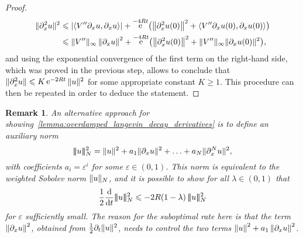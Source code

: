 \documentclass[11pt,a4paper]{article}
\DeclareMathOperator{\e}{e}
\theoremstyle{plain}
\newtheorem{remark}{Remark}[section]
\numberwithin{equation}{section}
\renewcommand{\leq}{\leqslant}
\renewcommand{\geq}{\geqslant}
\begin{document}
\begin{proof}
    \begin{align*}
        \norm*{\partial_x^2 u}^2
        &\leq \abs{\ip{V'' \partial_x u}{\partial_x u}} + \e^{-4Rt} \bigl( \norm{\partial_x^2 u(0)}^2 + \ip{V'' \partial_x u(0)}{\partial_x u(0)} \bigr) \\
        &\leq \norm*{V''}_{\infty} \norm{\partial_x u}^2 + \e^{-4Rt} \bigl( \norm{\partial_x^2 u(0)}^2 + \norm*{V''}_{\infty} \norm*{\partial_x u(0)}^2 \bigr),
    \end{align*}
    and using the exponential convergence of the first term on the right-hand side,
    which was proved in the previous step,
    allows to conclude that $\norm*{\partial_x^2 u} \leq K \e^{-2 Rt} \norm*{u}^2$ for some appropriate constant $K \geq 1$.
    This procedure can then be repeated in order to deduce the statement.
\end{proof}

\newcommand{\auxnorm}[1]{|\!|\!| #1 |\!|\!|}
\begin{remark}
    An alternative approach for showing~\cref{lemma:overdamped_langevin_decay_derivatives} is
    to define an auxiliary norm
    \[
        \auxnorm{u}_N^2 = \norm*{u}^2 + a_1 \norm*{\partial_x u}^2 + \dotsc + a_N \norm*{\partial_x^N u}^2,
    \]
    with coefficients $a_i = \varepsilon^i$ for some $\varepsilon \in (0, 1)$.
    This norm is equivalent to the weighted Sobolev norm $\norm*{u}_N$,
    and it is possible to show for all $\lambda \in (0, 1)$ that
    \[
        \frac{1}{2}\derivative*{1}{t} \auxnorm{u}_N^2 \leq - 2 R(1 - \lambda) \, \auxnorm{u}_N^2
    \]
    for $\varepsilon$ sufficiently small.
    The reason for the suboptimal rate here is that the term $\norm{\partial_x u}^2$,
    obtained from $\frac{1}{2} \partial_t \norm*{u}^2$,
    needs to control the two terms $\norm{u}^2 + a_1 \norm{\partial_x u}^2$.
\end{remark}



\end{document}
